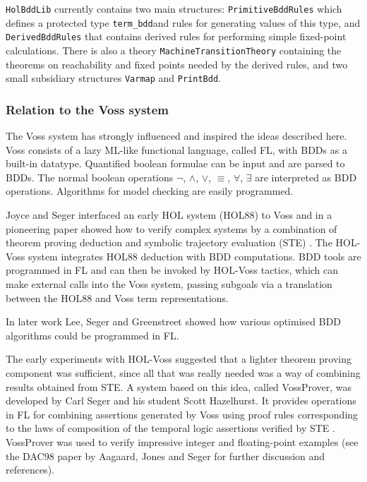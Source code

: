 \documentclass[12pt]{book}
\renewcommand{\t}[1]{\mbox{\tt #1}}
\newcommand\termbddty{\texttt{term\_bdd}{}}
\begin{document}
\t{HolBddLib} currently contains two main structures: \t{PrimitiveBddRules}
which defines a protected type \termbddty and rules for generating
values of this type, and \t{DerivedBddRules} that contains derived
rules for performing simple fixed-point calculations.  There is also a
theory \t{MachineTransitionTheory} containing the theorems on
reachability and fixed points needed by the derived rules,
and two small subsidiary structures \t{Varmap} and \t{PrintBdd}.


\subsubsection{Relation to the Voss system}\label{related}

The Voss system \cite{SegerVoss} has strongly influenced and inspired
the ideas described here. Voss consists of a lazy
ML-like functional language, called FL, with BDDs as a built-in datatype.
Quantified boolean formulae can be input and are parsed to BDDs.
The normal boolean operations $\neg$, $\wedge$, $\vee$, $\equiv$,
$\forall$, $\exists$ are interpreted as BDD operations.  
Algorithms for model checking are easily programmed.

Joyce and Seger interfaced an early HOL system (HOL88) to Voss and in
a pioneering paper showed how to verify complex systems by a
combination of theorem proving deduction and symbolic trajectory
evaluation (STE) \cite{JoyceSeger}. The HOL-Voss system integrates HOL88
deduction with BDD computations.  BDD tools are programmed in FL and
can then be invoked by HOL-Voss tactics, which can make external
calls into the Voss system, passing subgoals via a translation between
the HOL88 and Voss term representations.

In later work Lee, Seger and Greenstreet \cite{LeeGreenstreetSeger}
showed how various optimised BDD algorithms could be programmed in FL.

The early experiments with HOL-Voss suggested that a lighter theorem
proving component was sufficient, since all that was really needed was
a way of combining results obtained from STE. A system based on this
idea, called VossProver, was developed by Carl Seger and his student
Scott Hazelhurst. It provides operations in FL for combining
assertions generated by Voss using proof rules corresponding to the
laws of composition of the temporal logic assertions verified by STE
\cite{hazelhurst-kropfbook-97}.  
VossProver was used to verify
impressive integer and floating-point examples (see the DAC98
paper by Aagaard, Jones and Seger \cite{aagaard-dac-98} for further
discussion and references). 
\end{document}
